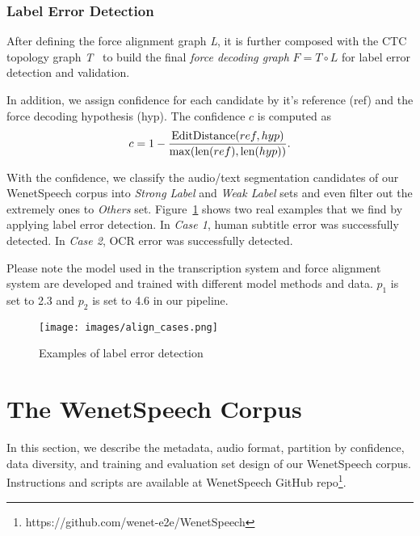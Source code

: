\documentclass{article}
\begin{document}
\vspace{-0.5em}
\subsubsection{Label Error Detection}
\label{sec:label_error_detection}
\vspace{-0.5em}

After defining the force alignment graph \textit{L}, it is further composed with the CTC topology graph \textit{T}~\cite{miao2015eesen} to build the final \textit{force decoding graph} $\textit{F} = \textit{T} \circ \textit{L}$ for label error detection and validation.

In addition, we assign confidence for each candidate by it's reference (ref) and the force decoding hypothesis (hyp). The confidence $c$ is computed as
\vspace{-1em}
$$
c = 1 - \frac{\text{EditDistance}(ref, hyp)}{\max(\text{len}(ref), \text{len}(hyp))}.
\vspace{-0.5em}
$$

With the confidence, we classify the audio/text segmentation candidates of our WenetSpeech corpus into \textit{Strong Label} and \textit{Weak Label} sets and even filter out the extremely ones to \textit{Others} set. Figure~\ref{fig:align_cases} shows two real examples that we find by applying label error detection. In \textit{Case 1}, human subtitle error was successfully detected. In \textit{Case 2}, OCR error was successfully detected.

Please note the model used in the transcription system and force alignment system are developed and trained with different model methods and data.
$p_1$ is set to 2.3 and $p_2$ is set to 4.6 in our pipeline.

\begin{figure}[ht]
  \vspace{-1em}
  \centering
  \texttt{[image: images/align\_cases.png]}
  \vspace{-2em}
  \caption{Examples of label error detection}
  \label{fig:align_cases}
  \vspace{-1em}
\end{figure}






\vspace{-1.3em}
\section{The WenetSpeech Corpus}\label{sec:corpus}
\vspace{-1em}
In this section, we describe the metadata, audio format, partition by confidence, data diversity, and training and evaluation set design of our WenetSpeech corpus. Instructions and scripts are available at WenetSpeech GitHub repo\footnote{https://github.com/wenet-e2e/WenetSpeech}. 
\end{document}
